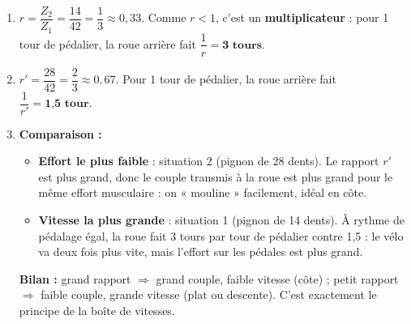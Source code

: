 \documentclass[11pt]{article}
\newcommand{\cle}[1]{{\popxbold\color{popdark}#1}}
\begin{document}
\begin{corrige}
\begin{enumerate}
    \item $r = \dfrac{Z_2}{Z_1} = \dfrac{14}{42} = \dfrac{1}{3} \approx 0,33$. Comme $r < 1$, c'est un \textbf{multiplicateur} : pour 1 tour de pédalier, la roue arrière fait $\dfrac{1}{r} = \textbf{3 tours}$.
    \item $r' = \dfrac{28}{42} = \dfrac{2}{3} \approx 0,67$. Pour 1 tour de pédalier, la roue arrière fait $\dfrac{1}{r'} = \textbf{1,5 tour}$.
    \item \textbf{Comparaison :}
    \begin{itemize}
        \item \textbf{Effort le plus faible} : situation 2 (pignon de 28 dents). Le rapport $r'$ est plus grand, donc le \cle{couple} transmis à la roue est plus grand pour le même effort musculaire : on « mouline » facilement, idéal en côte.
        \item \textbf{Vitesse la plus grande} : situation 1 (pignon de 14 dents). À rythme de pédalage égal, la roue fait 3 tours par tour de pédalier contre 1,5 : le vélo va deux fois plus vite, mais l'effort sur les pédales est plus grand.
    \end{itemize}
    \textbf{Bilan :} grand rapport $\Rightarrow$ grand couple, faible vitesse (côte) ; petit rapport $\Rightarrow$ faible couple, grande vitesse (plat ou descente). C'est exactement le principe de la boîte de vitesses.
\end{enumerate}
\end{corrige}
\end{document}
